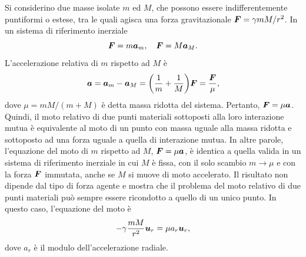 Si considerino due masse isolate $m$ ed $M$, che possono essere indifferentemente puntiformi o estese, tra le quali agisca una forza gravitazionale $\bm{F}=\gamma mM/r^2$. In un sistema di riferimento inerziale 
\begin{equation}
    \bm{F}=m\bm{a}_m,\quad\bm{F}=M\bm{a}_M.
\end{equation}
L'accelerazione relativa di $m$ rispetto ad $M$ è
\begin{equation}
    \bm{a}=\bm{a}_m-\bm{a}_M=\bigg(\frac{1}{m}+\frac{1}{M}\bigg)\bm{F}=\frac{\bm{F}}{\mu},
\end{equation}
dove $\mu=mM/(m+M)$ è detta massa ridotta del sistema. Pertanto, $\bm{F}=\mu\bm{a}$. Quindi, il moto relativo di due punti materiali sottoposti alla loro interazione mutua è equivalente al moto di un punto con massa uguale alla massa ridotta e sottoposto ad una forza uguale a quella di interazione mutua. In altre parole, l'equazione del moto di $m$ rispetto ad $M$, $\bm{F}=\mu\bm{a}$, è identica a quella valida in un sistema di riferimento inerziale in cui $M$ è fissa, con il solo scambio $m\to\mu$ e con la forza $\bm{F}$ immutata, anche se $M$ si muove di moto accelerato. Il risultato non dipende dal tipo di forza agente e mostra che il problema del moto relativo di due punti materiali può sempre essere ricondotto a quello di un unico punto. In questo caso, l'equazione del moto è
\begin{equation}
\label{eq: eqzn. moto dei pianeti}
    -\gamma\frac{mM}{r^2}\bm{u}_r=\mu a_r\bm{u}_r,
\end{equation}
dove $a_r$ è il modulo dell'accelerazione radiale.

